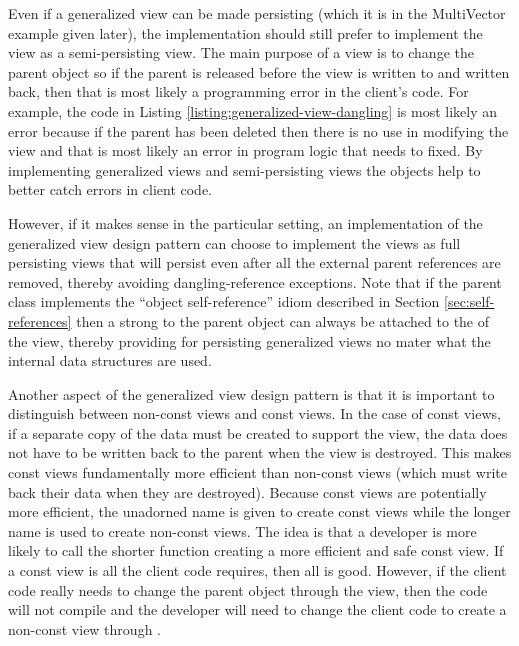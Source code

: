 \documentclass[pdf,ps2pdf,11pt]{SANDreport}
\begin{document}
Even if a generalized view can be made persisting (which it is in the
MultiVector example given later), the implementation should still
prefer to implement the view as a semi-persisting view.  The main
purpose of a view is to change the parent object so if the parent is
released before the view is written to and written back, then that is
most likely a programming error in the client's code.  For example,
the code in Listing {}\ref{listing:generalized-view-dangling} is most
likely an error because if the parent has been deleted then there is
no use in modifying the view and that is most likely an error in
program logic that needs to fixed.  By implementing generalized views
and semi-persisting views the objects help to better catch errors in
client code.

However, if it makes sense in the particular setting, an
implementation of the generalized view design pattern can choose to
implement the views as full persisting views that will persist even
after all the external parent references are removed, thereby avoiding
dangling-reference exceptions.  Note that if the parent class
implements the ``object self-reference'' idiom described in Section
{}\ref{sec:self-references} then a strong {} to the parent
object can always be attached to the {} of the view, thereby
providing for persisting generalized views no mater what the internal
data structures are used.

Another aspect of the generalized view design pattern is that it is
important to distinguish between non-const views and const views.  In
the case of const views, if a separate copy of the data must be
created to support the view, the data does not have to be written back
to the parent when the view is destroyed.  This makes const views
fundamentally more efficient than non-const views (which must write
back their data when they are destroyed).  Because const views are
potentially more efficient, the unadorned name {} 
is given to create const views while the longer name
{} is used to create non-const views.
The idea is that a developer is more likely to call the shorter
{} function creating a more efficient and safe
const view.  If a const view is all the client code requires, then all
is good.  However, if the client code really needs to change the
parent object through the view, then the code will not compile and the
developer will need to change the client code to create a non-const
view through {}.
\end{document}
